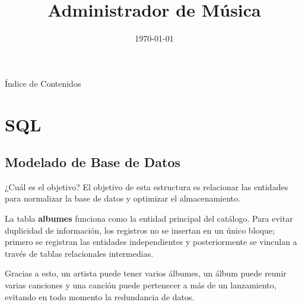 \documentclass[aspectratio=169, 10pt]{beamer}
\title[Administrador de Música]{Administrador de Música}
\institute[ESFM - IPN]{Escuela Superior de Física y Matemáticas}
\date{\today}
\begin{document}
\begin{frame}
    \titlepage
\end{frame}

\begin{frame}{Índice de Contenidos}
    \tableofcontents
\end{frame}

\section{SQL}
\subsection{Modelado de Base de Datos}
    \begin{frame}{¿Cuál es el objetivo?}
        El objetivo de esta estructura es relacionar las entidades para normalizar la base de datos y optimizar el almacenamiento.\bigskip

        La tabla \textbf{albumes} funciona como la entidad principal del catálogo. Para evitar duplicidad de información, los registros no se insertan en un único bloque; primero se registran las entidades independientes y posteriormente se vinculan a través de tablas relacionales intermedias.\bigskip

        Gracias a esto, un artista puede tener varios álbumes, un álbum puede reunir varias canciones y una canción puede pertenecer a más de un lanzamiento, evitando en todo momento la redundancia de datos.
    \end{frame}%
\end{document}
